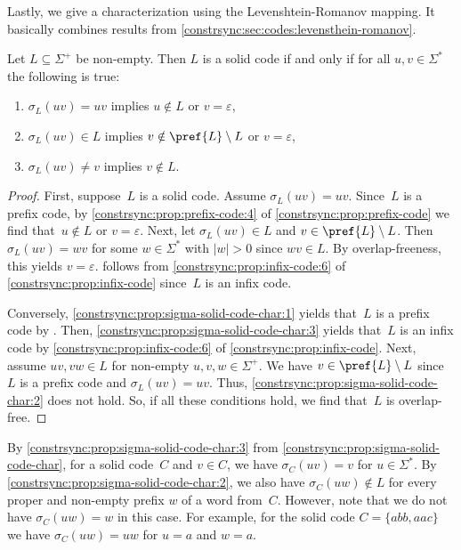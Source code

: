 Lastly, we give a characterization using the Levenshtein-Romanov mapping. It basically combines results
from \cref{constrsync:sec:codes:levensthein-romanov}.

\begin{proposition} \label{constrsync:prop:sigma-solid-code-char}
	Let $L \subseteq \Sigma^+$ be non-empty.
	Then $L$ is a solid code if and only if
	for all $u,v \in \Sigma^*$ the following is true:
	\begin{enumerate}
		\item \label{constrsync:prop:sigma-solid-code-char:1} 
		$\sigma_L(uv) = uv$ implies $u \notin L$ or $v = \varepsilon$,
		
		\item \label{constrsync:prop:sigma-solid-code-char:2} $\sigma_L(uv) \in L$ implies $v \notin \pref{L}\setminus L$ or $v = \varepsilon$,
		
		\item \label{constrsync:prop:sigma-solid-code-char:3} $\sigma_L(uv) \ne v$ implies $v \notin L$. 	
	\end{enumerate}
\end{proposition}
\begin{proof}
	First, suppose~$L$ is a solid code.	
	Assume $\sigma_L(uv) = uv$.
	Since~$L$ is a prefix code,
	by \cref{constrsync:prop:prefix-code:4} of \cref{constrsync:prop:prefix-code}
	we find that~$u \notin L$
	or $v = \varepsilon$.
	Next, let $\sigma_L(uv) \in L$ and $v \in \pref{L}\setminus L$.
	Then $\sigma_L(uv) = wv$ for some $w \in \Sigma^*$
	with $|w| > 0$ since $wv \in L$.
	By overlap-freeness, this yields $v = \varepsilon$.	
	follows from \cref{constrsync:prop:infix-code:6} of \cref{constrsync:prop:infix-code}
	since~$L$ is an infix code.
		
	Conversely, \cref{constrsync:prop:sigma-solid-code-char:1} 
	yields that~$L$ is a prefix code by .
	Then, \cref{constrsync:prop:sigma-solid-code-char:3} 
	yields that~$L$ is an infix code by \cref{constrsync:prop:infix-code:6} 
	of \cref{constrsync:prop:infix-code}.
	Next, assume $uv, vw \in L$ for non-empty $u,v,w \in \Sigma^+$.
	We have $v \in \pref{L}\setminus L$ since~$L$ is a prefix code
	and $\sigma_L(uv) = uv$. Thus, \cref{constrsync:prop:sigma-solid-code-char:2} 
	does not hold. So, if all these conditions hold,
	we find that~$L$ is overlap-free.
\end{proof}

\begin{remark}
	By \cref{constrsync:prop:sigma-solid-code-char:3} 
	from \cref{constrsync:prop:sigma-solid-code-char},
	for a solid code~$C$ and $v \in C$,
	we have $\sigma_C(uv) = v$ for $u \in \Sigma^*$.
	By \cref{constrsync:prop:sigma-solid-code-char:2},
	we also have $\sigma_C(uw) \notin L$
	for every proper and non-empty prefix $w$
	of a word from~$C$.
	However, note that we do not have $\sigma_C(uw) = w$
	in this case. For example, for the solid code $C = \{abb, aac\}$
	we have $\sigma_C(uw) = uw$ for $u = a$
	and $w = a$.
\end{remark}